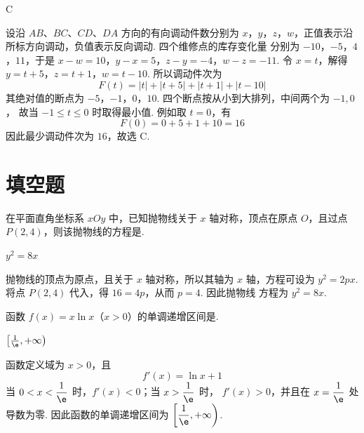 \begin{answer}
C
\end{answer}

\begin{solution}
设沿 \(AB\)、\(BC\)、\(CD\)、\(DA\) 方向的有向调动件数分别为
\(x\)，\(y\)，\(z\)，\(w\)，正值表示沿所标方向调动，负值表示反向调动. 四个维修点的库存变化量
分别为 \(-10\)，\(-5\)，\(4\)，\(11\)，于是
\(x-w=10\)，\(y-x=5\)，\(z-y=-4\)，\(w-z=-11\).
令 \(x=t\)，解得 \(y=t+5\)，\(z=t+1\)，\(w=t-10\). 所以调动件次为
\[
F(t)=|t|+|t+5|+|t+1|+|t-10|
\]
其绝对值的断点为 \(-5\)，\(-1\)，\(0\)，\(10\). 四个断点按从小到大排列，中间两个为 \(-1,0\)，
故当 \(-1\leqslant t\leqslant0\) 时取得最小值. 例如取 \(t=0\)，有
\[
F(0)=0+5+1+10=16
\]
因此最少调动件次为 \(16\)，故选 C.
\end{solution}

\section{填空题}

\begin{problem}
在平面直角坐标系 \(xOy\) 中，已知抛物线关于 \(x\) 轴对称，顶点在原点 \(O\)，且过点 \(P(2,4)\)，则该抛物线的方程是\fillinblank{}.
\end{problem}

\begin{answer}
\(y^{2}=8x\)
\end{answer}

\begin{solution}
抛物线的顶点为原点，且关于 \(x\) 轴对称，所以其轴为 \(x\) 轴，方程可设为
\(y^{2}=2px\). 将点 \(P(2,4)\) 代入，得 \(16=4p\)，从而 \(p=4\). 因此抛物线
方程为 \(y^{2}=8x\).
\end{solution}

\begin{problem}
函数 \( f(x) = x \ln x \)（\(x > 0\)）的单调递增区间是\fillinblank{}.
\end{problem}

\begin{answer}
\(\left[\frac{1}{\e},+\infty\right)\)
\end{answer}

\begin{solution}
函数定义域为 \(x>0\)，且
\[
f'(x)=\ln x+1
\]
当 \(0<x<\dfrac{1}{\e}\) 时，\(f'(x)<0\)；当 \(x>\dfrac{1}{\e}\) 时，
\(f'(x)>0\)，并且在 \(x=\dfrac{1}{\e}\) 处导数为零. 因此函数的单调递增区间为
\(\left[\dfrac{1}{\e},+\infty\right)\).
\end{solution}

